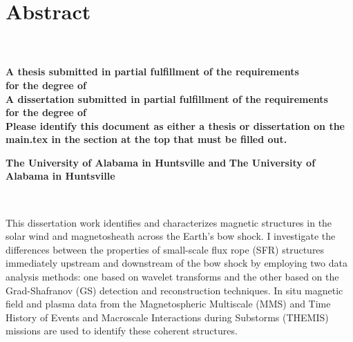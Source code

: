 
\chapter{Abstract}
     \begin{center}
        \large
        \singlespacing
        \textbf{\thesistitle}\\
        \vspace{0.5cm}
        \large
        \textbf{\studentname}\\
        \vspace{0.5cm}
        \normalsize
        \ifdefined\thesis
        \textbf{A thesis submitted in partial fulfillment of the requirements \\for the degree of \degree}\\  
        \else
        \ifdefined\dissertation
        \textbf{A dissertation submitted in partial fulfillment of the requirements \\for the degree of \degree}\\
        \else
        \textbf{Please identify this document as either a thesis or dissertation on the main.tex in the section at the top that must be filled out.}\\
    \fi
    \fi
        \vspace{1cm}
        \textbf{\department}
        
        \vspace{0.25cm}

        \ifdefined\jointuni
        \textbf{The University of Alabama in Huntsville and  \jointuni}
        \else
        \textbf{The University of Alabama in Huntsville}
    \fi

        
        \vspace{0.1cm}
        \textbf{\gradmonth\ \gradyear}
        


    \end{center}
\vspace{0.1cm}

\doublespacing
This dissertation work identifies and characterizes magnetic structures in the solar wind and magnetosheath across the Earth's bow shock. I investigate the differences between the properties of small-scale flux rope (SFR) structures immediately upstream and downstream of the bow shock by employing two data analysis methods: one based on wavelet transforms and the other based on the Grad-Shafranov (GS) detection and reconstruction techniques. In situ magnetic field and plasma data from the Magnetospheric Multiscale (MMS) and Time History of Events and Macroscale Interactions during Substorms (THEMIS) missions are used to identify these coherent structures. 

